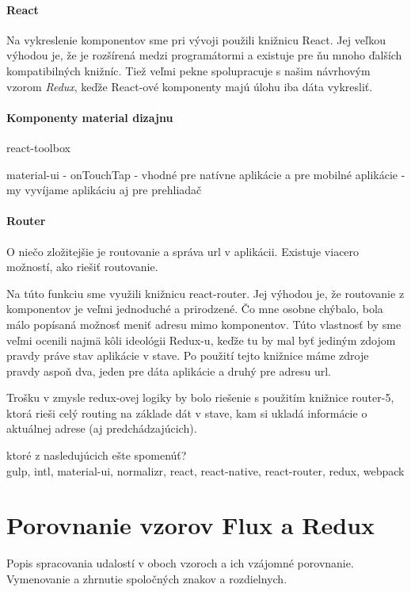 \paragraph{React}
Na vykreslenie komponentov sme pri vývoji použili knižnicu React. Jej veľkou výhodou je, že je rozšírená medzi programátormi a existuje pre ňu mnoho ďalších kompatibilných knižníc. Tiež veľmi pekne spolupracuje s našim návrhovým vzorom \emph{Redux}, keďže React-ové komponenty majú úlohu iba dáta vykresliť.

\paragraph{Komponenty material dizajnu}
\TODO{}

react-toolbox

material-ui
- onTouchTap
- vhodné pre natívne aplikácie a pre mobilné aplikácie
- my vyvíjame aplikáciu aj pre prehliadač

\paragraph{Router}%
O niečo zložitejšie je routovanie a správa url v aplikácii. Existuje viacero možností, ako riešiť routovanie. 

Na túto funkciu sme využili knižnicu react-router. Jej výhodou je, že routovanie z komponentov je veľmi jednoduché a prirodzené. Čo mne osobne chýbalo, bola málo popísaná možnosť meniť adresu mimo komponentov. Túto vlastnosť by sme veľmi ocenili najmä kôli ideológii Redux-u, keďže tu by mal byť jediným zdojom pravdy práve stav aplikácie v stave. Po použití tejto knižnice máme zdroje pravdy aspoň dva, jeden pre dáta aplikácie a druhý pre adresu url. %

Trošku  v zmysle redux-ovej logiky by bolo riešenie s použitím knižnice router-5, ktorá rieši celý routing na základe dát v stave, kam si ukladá informácie o aktuálnej adrese (aj predchádzajúcich).

\cite[Redux]{Redux}

\TODO{} ktoré z nasledujúcich ešte spomenúť?\\
gulp, intl, material-ui, normalizr, react, react-native, react-router, redux, webpack




\section{Porovnanie vzorov Flux a Redux}
Popis spracovania udalostí v oboch vzoroch a ich vzájomné porovnanie. Vymenovanie a zhrnutie spoločných znakov a rozdielnych.

